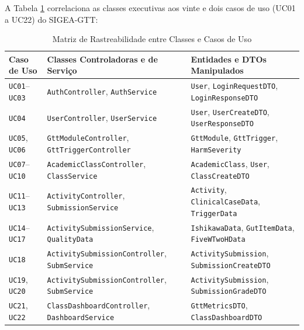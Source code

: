 A Tabela \ref{tab_rastreabilidade_classes_uc} correlaciona as classes executivas aos vinte e dois casos de uso (UC01 a UC22) do SIGEA-GTT:

\begin{table}[!ht]
\centering
\caption{Matriz de Rastreabilidade entre Classes e Casos de Uso}
\label{tab_rastreabilidade_classes_uc}
\footnotesize
\begin{tabularx}{\textwidth}{p{2.2cm} p{4.8cm} X}
\toprule
\textbf{Caso de Uso} & \textbf{Classes Controladoras e de Serviço} & \textbf{Entidades e DTOs Manipulados} \\
\midrule
\texttt{UC01}--\texttt{UC03} & \texttt{AuthController}, \texttt{AuthService} & \texttt{User}, \texttt{LoginRequestDTO}, \texttt{LoginResponseDTO} \\
\texttt{UC04} & \texttt{UserController}, \texttt{UserService} & \texttt{User}, \texttt{UserCreateDTO}, \texttt{UserResponseDTO} \\
\texttt{UC05}, \texttt{UC06} & \texttt{GttModuleController}, \texttt{GttTriggerController} & \texttt{GttModule}, \texttt{GttTrigger}, \texttt{HarmSeverity} \\
\texttt{UC07}--\texttt{UC10} & \texttt{AcademicClassController}, \texttt{ClassService} & \texttt{AcademicClass}, \texttt{User}, \texttt{ClassCreateDTO} \\
\texttt{UC11}--\texttt{UC13} & \texttt{ActivityController}, \texttt{SubmissionService} & \texttt{Activity}, \texttt{ClinicalCaseData}, \texttt{TriggerData} \\
\texttt{UC14}--\texttt{UC17} & \texttt{ActivitySubmission}\newline\texttt{Service}, \texttt{QualityData} & \texttt{IshikawaData}, \texttt{GutItemData}, \texttt{FiveWTwoHData} \\
\texttt{UC18} & \texttt{ActivitySubmission}\newline\texttt{Controller}, \texttt{SubmService} & \texttt{ActivitySubmission}, \texttt{SubmissionCreateDTO} \\
\texttt{UC19}, \texttt{UC20} & \texttt{ActivitySubmission}\newline\texttt{Controller}, \texttt{SubmService} & \texttt{ActivitySubmission}, \texttt{SubmissionGradeDTO} \\
\texttt{UC21}, \texttt{UC22} & \texttt{ClassDashboardController}, \texttt{DashboardService} & \texttt{GttMetricsDTO}, \texttt{ClassDashboardDTO} \\
\bottomrule
\end{tabularx}
\end{table}

